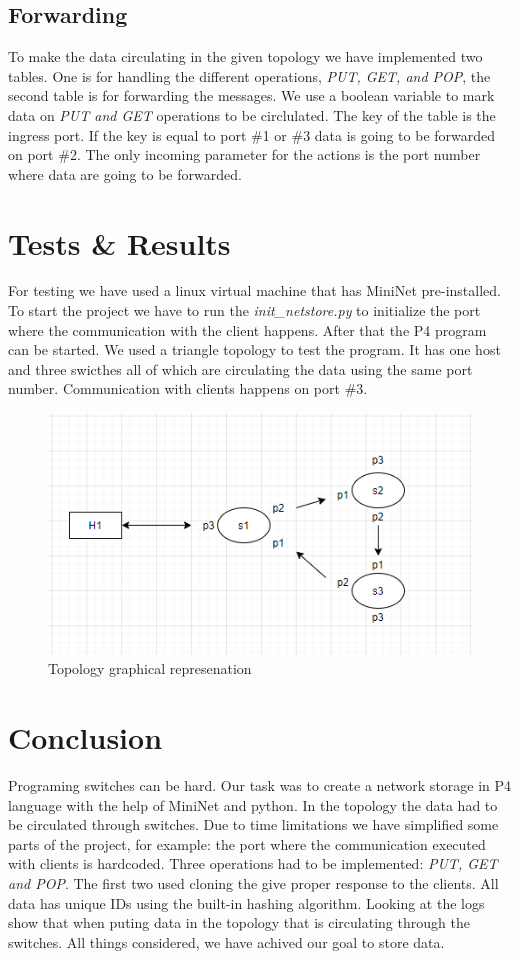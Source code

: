\documentclass[sigconf,natbib=false]{acmart}
\begin{document}
\subsection{Forwarding}
To make the data circulating in the given topology we have implemented two tables. One is for handling the different operations, \textit{PUT, GET, and POP}, the second table is for forwarding the messages. We use a boolean variable to mark data on \textit{PUT and GET} operations to be circlulated. The key of the table is the ingress port. If the key is equal to port \#1 or \#3 data is going to be forwarded on port \#2. The only incoming parameter for the actions is the port number where data are going to be forwarded.
\section{Tests \& Results}
For testing we have used a linux virtual machine that has MiniNet pre-installed. To start the project we have to run the \textit{init\_netstore.py} to initialize the port where the communication with the client happens. After that the P4 program can be started. We used a triangle topology to test the program. It has one host and three swicthes all of which are circulating the data using the same port number. Communication with clients happens on port \#3.
\begin{figure}[ht]
	\caption{Topology graphical represenation}
	\includegraphics[scale=0.7]{top.png}
	\centering
\end{figure}

\section{Conclusion}
Programing switches can be hard. Our task was to create a network storage in P4 language with the help of MiniNet and python. In the topology the data had to be circulated through switches. Due to time limitations we have simplified some parts of the project, for example: the port where the communication executed with clients is hardcoded. Three operations had to be implemented: \textit{PUT, GET and POP}. The first two used cloning the give proper response to the clients. All data has unique IDs using the built-in hashing algorithm. Looking at the logs show that when puting data in the topology that is circulating through the switches. All things considered, we have achived our goal to store data.
\end{document}
